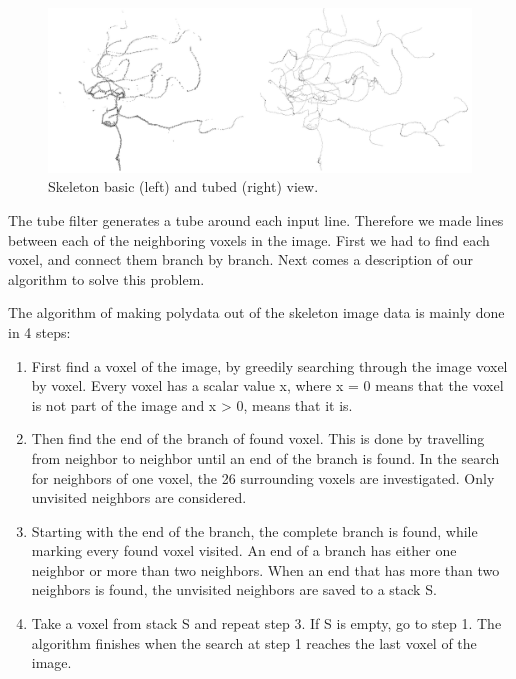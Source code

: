 \begin{figure}
	\centering
	\includegraphics[scale=0.35]{fig/skeleton-basic-tubed}
	\caption{Skeleton basic (left) and tubed (right) view.}\label{fig:skeleton-basic-tubed}
\end{figure}

The tube filter generates a tube around each input line. Therefore we made lines between each of the neighboring voxels in the image. First we had to find each voxel, and connect them branch by branch. Next comes a description of our algorithm to solve this problem.

The algorithm of making polydata out of the skeleton image data is mainly done in 4 steps:
\begin{enumerate}
	\item First find a voxel of the image, by greedily searching through the image voxel by voxel. Every voxel has a scalar value x, where x = 0 means that the voxel is not part of the image and x > 0, means that it is. 

	\item Then find the end of the branch of found voxel. This is done by travelling from neighbor to neighbor until an end of the branch is found. In the search for neighbors of one voxel, the 26 surrounding voxels are investigated. Only unvisited neighbors are considered.

	\item Starting with the end of the branch, the complete branch is found, while marking every found voxel visited. An end of a branch has either one neighbor or more than two neighbors. When an end that has more than two neighbors is found, the unvisited neighbors are saved to a stack S.

	\item Take a voxel from stack S and repeat step 3. If S is empty, go to step 1. The algorithm finishes when the search at step 1 reaches the last voxel of the image.
\end{enumerate}

